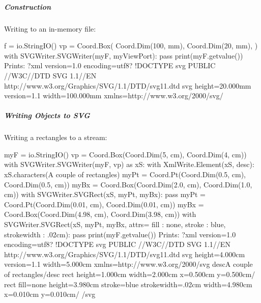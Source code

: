 \documentclass[letterpaper,10pt,english]{sphinxmanual}
\begin{document}
\subparagraph{Construction}
\label{\detokenize{ref/util/plot/SVGWriter:construction}}
Writing to an in-memory file:

\begin{sphinxVerbatim}[commandchars=\\\{\}]
f = io.StringIO()
vp = Coord.Box(
    Coord.Dim(100, \PYGZsq{}mm\PYGZsq{}),
    Coord.Dim(20, \PYGZsq{}mm\PYGZsq{}),
)
with SVGWriter.SVGWriter(myF, myViewPort):
    pass
print(myF.getvalue())
\PYGZsh{} Prints:
\PYGZlt{}?xml version=\PYGZsq{}1.0\PYGZsq{} encoding=\PYGZdq{}utf\PYGZhy{}8\PYGZdq{}?\PYGZgt{}
\PYGZlt{}!DOCTYPE svg PUBLIC \PYGZdq{}\PYGZhy{}//W3C//DTD SVG 1.1//EN\PYGZdq{} \PYGZdq{}http://www.w3.org/Graphics/SVG/1.1/DTD/svg11.dtd\PYGZdq{}\PYGZgt{}
\PYGZlt{}svg height=\PYGZdq{}20.000mm\PYGZdq{} version=\PYGZdq{}1.1\PYGZdq{} width=\PYGZdq{}100.000mm\PYGZdq{} xmlns=\PYGZdq{}http://www.w3.org/2000/svg\PYGZdq{}/\PYGZgt{}
\end{sphinxVerbatim}


\subparagraph{Writing Objects to SVG}
\label{\detokenize{ref/util/plot/SVGWriter:writing-objects-to-svg}}
Writing a rectangles to a stream:

\begin{sphinxVerbatim}[commandchars=\\\{\}]
myF = io.StringIO()
vp = Coord.Box(Coord.Dim(5, \PYGZsq{}cm\PYGZsq{}), Coord.Dim(4, \PYGZsq{}cm\PYGZsq{}))
with SVGWriter.SVGWriter(myF, vp) as xS:
    with XmlWrite.Element(xS, \PYGZsq{}desc\PYGZsq{}):
        xS.characters(\PYGZsq{}A couple of rectangles\PYGZsq{})
    myPt = Coord.Pt(Coord.Dim(0.5, \PYGZsq{}cm\PYGZsq{}), Coord.Dim(0.5, \PYGZsq{}cm\PYGZsq{}))
    myBx = Coord.Box(Coord.Dim(2.0, \PYGZsq{}cm\PYGZsq{}), Coord.Dim(1.0, \PYGZsq{}cm\PYGZsq{}))
    with SVGWriter.SVGRect(xS, myPt, myBx):
        pass
    myPt = Coord.Pt(Coord.Dim(0.01, \PYGZsq{}cm\PYGZsq{}), Coord.Dim(0.01, \PYGZsq{}cm\PYGZsq{}))
    myBx = Coord.Box(Coord.Dim(4.98, \PYGZsq{}cm\PYGZsq{}), Coord.Dim(3.98, \PYGZsq{}cm\PYGZsq{}))
    with SVGWriter.SVGRect(xS, myPt, myBx, attrs= \PYGZob{}\PYGZsq{}fill\PYGZsq{} : \PYGZdq{}none\PYGZdq{}, \PYGZsq{}stroke\PYGZsq{} : \PYGZdq{}blue\PYGZdq{}, \PYGZsq{}stroke\PYGZhy{}width\PYGZsq{} : \PYGZdq{}.02cm\PYGZdq{}\PYGZcb{}):
        pass
print(myF.getvalue())
\PYGZsh{} Prints:
\PYGZlt{}?xml version=\PYGZsq{}1.0\PYGZsq{} encoding=\PYGZdq{}utf\PYGZhy{}8\PYGZdq{}?\PYGZgt{}
\PYGZlt{}!DOCTYPE svg PUBLIC \PYGZdq{}\PYGZhy{}//W3C//DTD SVG 1.1//EN\PYGZdq{} \PYGZdq{}http://www.w3.org/Graphics/SVG/1.1/DTD/svg11.dtd\PYGZdq{}\PYGZgt{}
\PYGZlt{}svg height=\PYGZdq{}4.000cm\PYGZdq{} version=\PYGZdq{}1.1\PYGZdq{} width=\PYGZdq{}5.000cm\PYGZdq{} xmlns=\PYGZdq{}http://www.w3.org/2000/svg\PYGZdq{}\PYGZgt{}
    \PYGZlt{}desc\PYGZgt{}A couple of rectangles\PYGZlt{}/desc\PYGZgt{}
    \PYGZlt{}rect height=\PYGZdq{}1.000cm\PYGZdq{} width=\PYGZdq{}2.000cm\PYGZdq{} x=\PYGZdq{}0.500cm\PYGZdq{} y=\PYGZdq{}0.500cm\PYGZdq{}/\PYGZgt{}
    \PYGZlt{}rect fill=\PYGZdq{}none\PYGZdq{} height=\PYGZdq{}3.980cm\PYGZdq{} stroke=\PYGZdq{}blue\PYGZdq{} stroke\PYGZhy{}width=\PYGZdq{}.02cm\PYGZdq{} width=\PYGZdq{}4.980cm\PYGZdq{} x=\PYGZdq{}0.010cm\PYGZdq{} y=\PYGZdq{}0.010cm\PYGZdq{}/\PYGZgt{}
\PYGZlt{}/svg\PYGZgt{}
\end{sphinxVerbatim}
\end{document}
